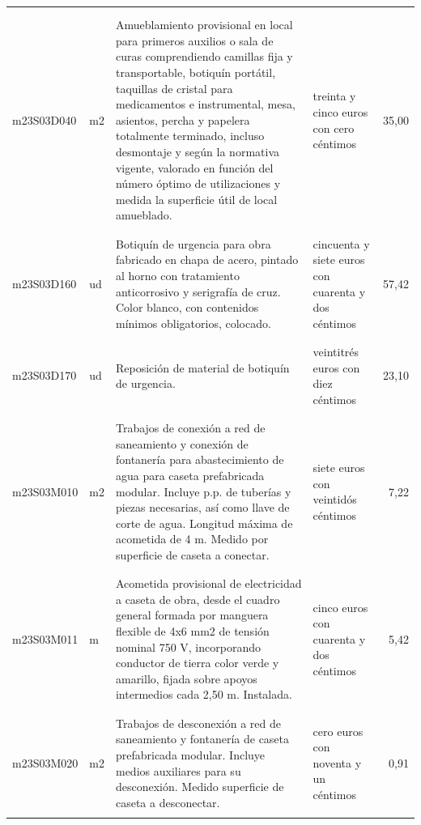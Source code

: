 \documentclass{book}%
\begin{document}
\begin{longtable}{|l|l|p{5cm}|p{3cm}|r|}
&&&&\\%
&&&&\\%
m23S03D040&m2&Amueblamiento provisional en local para primeros auxilios o sala de curas comprendiendo camillas fija y transportable, botiquín portátil, taquillas de cristal para medicamentos e instrumental, mesa, asientos, percha y papelera totalmente terminado, incluso desmontaje y según la normativa vigente, valorado en función del número óptimo de utilizaciones y medida la superficie útil de local amueblado.&treinta y cinco euros con cero céntimos&35,00\\%
&&&&\\%
&&&&\\%
m23S03D160&ud&Botiquín de urgencia para obra fabricado en chapa de acero, pintado al horno con tratamiento anticorrosivo y serigrafía de cruz. Color blanco, con contenidos mínimos obligatorios, colocado.&cincuenta y siete euros con cuarenta y dos céntimos&57,42\\%
&&&&\\%
&&&&\\%
m23S03D170&ud&Reposición de material de botiquín de urgencia.&veintitrés euros con diez céntimos&23,10\\%
&&&&\\%
&&&&\\%
m23S03M010&m2&Trabajos de conexión a red de saneamiento y conexión de fontanería para abastecimiento de agua para caseta prefabricada modular. Incluye p.p. de tuberías y piezas necesarias, así como llave de corte de agua. Longitud máxima de acometida de 4 m. Medido por superficie de caseta a conectar.&siete euros con veintidós céntimos&7,22\\%
&&&&\\%
&&&&\\%
m23S03M011&m&Acometida provisional de electricidad a caseta de obra, desde el cuadro general formada por manguera flexible de 4x6 mm2 de tensión nominal 750 V, incorporando conductor de tierra color verde y amarillo, fijada sobre apoyos intermedios cada 2,50 m. Instalada.&cinco euros con cuarenta y dos céntimos&5,42\\%
&&&&\\%
&&&&\\%
m23S03M020&m2&Trabajos de desconexión a red de saneamiento y fontanería de caseta prefabricada modular. Incluye medios auxiliares para su desconexión. Medido superficie de caseta a desconectar.&cero euros con noventa y un céntimos&0,91\\%
&&&&\\%

\end{longtable}
\end{document}
